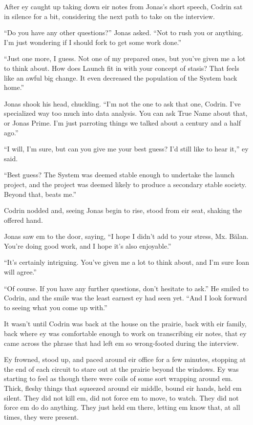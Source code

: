 After ey caught up taking down eir notes from Jonas's short speech, Codrin sat in silence for a bit, considering the next path to take on the interview.

``Do you have any other questions?'' Jonas asked. ``Not to rush you or anything. I'm just wondering if I should fork to get some work done.''

``Just one more, I guess. Not one of my prepared ones, but you've given me a lot to think about. How does Launch fit in with your concept of stasis? That feels like an awful big change. It even decreased the population of the System back home.''

Jonas shook his head, chuckling. ``I'm not the one to ask that one, Codrin. I've specialized way too much into data analysis. You can ask True Name about that, or Jonas Prime. I'm just parroting things we talked about a century and a half ago.''

``I will, I'm sure, but can you give me your best guess? I'd still like to hear it,'' ey said.

``Best guess? The System was deemed stable enough to undertake the launch project, and the project was deemed likely to produce a secondary stable society. Beyond that, beats me.''

Codrin nodded and, seeing Jonas begin to rise, stood from eir seat, shaking the offered hand.

Jonas saw em to the door, saying, ``I hope I didn't add to your stress, Mx. Bălan. You're doing good work, and I hope it's also enjoyable.''

``It's certainly intriguing. You've given me a lot to think about, and I'm sure Ioan will agree.''

``Of course. If you have any further questions, don't hesitate to ask.'' He smiled to Codrin, and the smile was the least earnest ey had seen yet. ``And I look forward to seeing what you come up with.''

It wasn't until Codrin was back at the house on the prairie, back with eir family, back where ey was comfortable enough to work on transcribing eir notes, that ey came across the phrase that had left em so wrong-footed during the interview.

Ey frowned, stood up, and paced around eir office for a few minutes, stopping at the end of each circuit to stare out at the prairie beyond the windows. Ey was starting to feel as though there were coils of some sort wrapping around em. Thick, fleshy things that squeezed around eir middle, bound eir hands, held em silent. They did not kill em, did not force em to move, to watch. They did not force em do do anything. They just held em there, letting em know that, at all times, they were present.


